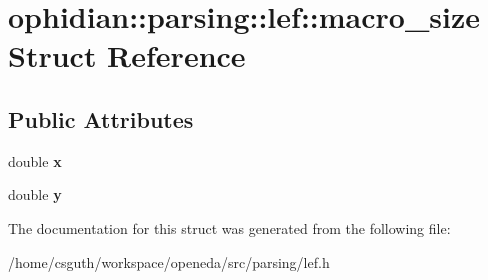 \hypertarget{structophidian_1_1parsing_1_1lef_1_1macro__size}{\section{ophidian\-:\-:parsing\-:\-:lef\-:\-:macro\-\_\-size Struct Reference}
\label{structophidian_1_1parsing_1_1lef_1_1macro__size}
}
\subsection*{Public Attributes}
\begin{DoxyCompactItemize}
\item 
\hypertarget{structophidian_1_1parsing_1_1lef_1_1macro__size_a417ffb10921b09b51433b294931f2371}{double {\bfseries x}}\label{structophidian_1_1parsing_1_1lef_1_1macro__size_a417ffb10921b09b51433b294931f2371}

\item 
\hypertarget{structophidian_1_1parsing_1_1lef_1_1macro__size_a5f4559073c0861a01aeec9bae8bb0f22}{double {\bfseries y}}\label{structophidian_1_1parsing_1_1lef_1_1macro__size_a5f4559073c0861a01aeec9bae8bb0f22}

\end{DoxyCompactItemize}


The documentation for this struct was generated from the following file\-:\begin{DoxyCompactItemize}
\item 
/home/csguth/workspace/openeda/src/parsing/lef.\-h\end{DoxyCompactItemize}
